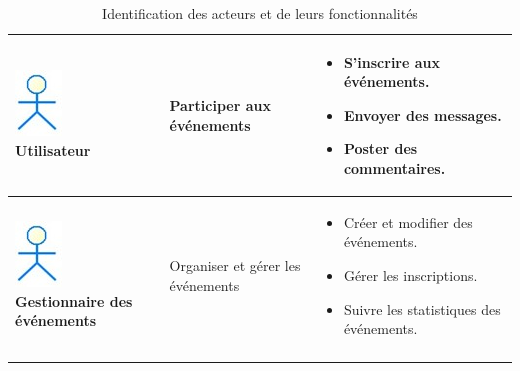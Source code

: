 \begin{longtable}{|p{4cm}|p{5cm}|p{6cm}|}
\parbox[c][3.5cm][c]{\linewidth}{\centering
\includegraphics[width=0.3\linewidth]{projet/images/diagramme de sequance/acteur.jpg} \\[0.2cm] \textbf{Utilisateur}
} & 
Participer aux événements & 
\begin{itemize}[leftmargin=0.5cm]
    \item S’inscrire aux événements.
    \item Envoyer des messages.
    \item Poster des commentaires.
\end{itemize} \\ 
\hline

\parbox[c][3.5cm][c]{\linewidth}{\centering
\includegraphics[width=0.3\linewidth]{projet/images/diagramme de sequance/acteur.jpg} \\[0.2cm] \textbf{Gestionnaire des événements}
} & 
Organiser et gérer les événements & 
\begin{itemize}[leftmargin=0.5cm]
    \item Créer et modifier des événements.
    \item Gérer les inscriptions.
    \item Suivre les statistiques des événements.
\end{itemize} \\ 
\hline
\caption{Identification des acteurs et de leurs fonctionnalités}
\label{tab:identification_acteurs}
\end{longtable}

